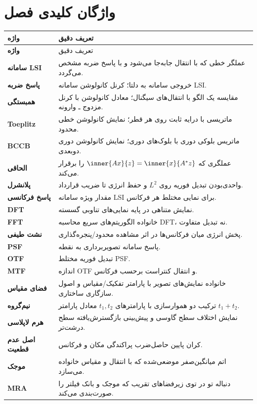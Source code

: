 \section{واژگان کلیدی فصل}

\begin{longtable}{>{\bfseries}p{}p{}}
\toprule
واژه & تعریف دقیق\\
\midrule
\endfirsthead
\toprule
واژه & تعریف دقیق\\
\midrule
\endhead
سامانه LSI & عملگر خطی که با انتقال جابه‌جا می‌شود و با پاسخ ضربه مشخص می‌گردد.\\
پاسخ ضربه & خروجی سامانه به دلتا؛ کرنل کانولوشن سامانه LSI.\\
همبستگی & مقایسه یک الگو با انتقال‌های سیگنال؛ معادل کانولوشن با کرنل مزدوج ـ وارونه.\\
Toeplitz & ماتریسی با درایه ثابت روی هر قطر؛ نمایش کانولوشن خطی محدود.\\
BCCB & ماتریس بلوکی دوری با بلوک‌های دوری؛ نمایش کانولوشن دوری دوبعدی.\\
الحاقی & عملگری که \(\inner{Ax}{z}=\inner{x}{A^*z}\) را برقرار می‌کند.\\
پلانشرل & واحدی‌بودن تبدیل فوریه روی \(L^2\) و حفظ انرژی تا ضریب قرارداد.\\
پاسخ فرکانسی & مقدار ویژه سامانه LSI برای نمایی مختلط هر فرکانس.\\
DFT & نمایش متناهی در پایه نمایی‌های تناوبی گسسته.\\
FFT & خانواده الگوریتم‌های سریع محاسبه DFT، نه تبدیل متفاوت.\\
نشت طیفی & پخش انرژی میان فرکانس‌ها در اثر مشاهده محدود/پنجره‌گذاری.\\
PSF & پاسخ سامانه تصویربرداری به نقطه.\\
OTF & تبدیل فوریه مختلط PSF.\\
MTF & اندازه OTF و انتقال کنتراست برحسب فرکانس.\\
فضای مقیاس & خانواده نمایش‌های تصویر با پارامتر تفکیک/مقیاس و اصول سازگاری ساختاری.\\
نیم‌گروه & ترکیب دو هموارسازی با پارامترهای \(t_1,t_2\) معادل پارامتر \(t_1+t_2\).\\
هرم لاپلاسی & نمایش اختلاف سطح گاوسی و پیش‌بینی بازگسترش‌یافته سطح درشت‌تر.\\
اصل عدم قطعیت & کران پایین حاصل‌ضرب پراکندگی مکان و فرکانس.\\
موجک & اتم میانگین‌صفر موضعی‌شده که با انتقال و مقیاس خانواده می‌سازد.\\
MRA & دنباله تو در توی زیرفضاهای تقریب که موجک و بانک فیلتر را صورت‌بندی می‌کند.\\

\end{longtable}
